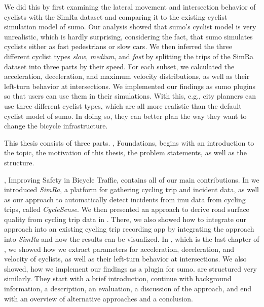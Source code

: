 \begin{itemize}
We did this by first examining the lateral movement and intersection behavior of cyclists with the SimRa dataset and comparing it to the existing cyclist simulation model of \ac{sumo}. 
Our analysis showed that \ac{sumo}'s cyclist model is very unrealistic, which is hardly surprising, considering the fact, that \ac{sumo} simulates cyclists either as fast pedestrians or slow cars.
We then inferred the three different cyclist types \textit{slow}, \textit{medium}, and \textit{fast} by splitting  the trips of the SimRa dataset into three parts by their speed.
For each subset, we calculated the acceleration, deceleration, and maximum velocity distributions, as well as their left-turn behavior at intersections.
We implemented our findings as \ac{sumo} plugins so that users can use them in their simulations.
With this, e.g., city planners can use three different cyclist types, which are all more realistic than the default cyclist model of \ac{sumo}.
In doing so, they can better plan the way they want to change the bicycle infrastructure. 
\end{itemize}

This thesis consists of three parts. , Foundations, begins with an introduction to the topic, the motivation of this thesis, the problem statements, as well as the structure.

, Improving Safety in Bicycle Traffic, contains all of our main contributions.
In  we introduced \textit{SimRa}, a platform for gathering cycling trip and incident data, as well as our approach to automatically detect incidents from \ac{imu} data from cycling trips, called \textit{CycleSense}.
We then presented an approach to derive road surface quality from cycling trip data in .
There, we also showed how to integrate our approach into an existing cycling trip recording app by integrating the approach into \textit{SimRa} and how the results can be visualized.
In , which is the last chapter of , we showed how we extract parameters for acceleration, deceleration, and velocity of cyclists, as well as their left-turn behavior at intersections.
We also showed, how we implement our findings as a plugin for \ac{sumo}.
 are structured very similarly.
They start with a brief introduction, continue with background information, a description, an evaluation, a discussion of the approach, and end with an overview of alternative approaches and a conclusion.

